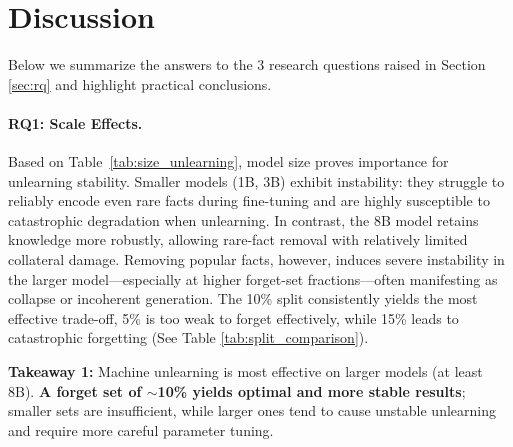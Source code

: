 \section{Discussion}



    

Below we summarize the answers to the 3 research questions raised in Section \ref{sec:rq} and highlight practical conclusions.

\paragraph{RQ1: Scale Effects.}  
Based on Table~\ref{tab:size_unlearning}, model size proves importance for unlearning stability. Smaller models (1B, 3B) exhibit instability: they struggle to reliably encode even rare facts during fine-tuning and are highly susceptible to catastrophic degradation when unlearning. In contrast, the 8B model retains knowledge more robustly, allowing rare-fact removal with relatively limited collateral damage. Removing popular facts, however, induces severe instability in the larger model—especially at higher forget-set fractions—often manifesting as collapse or incoherent generation. The 10\% split consistently yields the most effective trade-off, 5\% is too weak to forget effectively, while 15\% leads to catastrophic forgetting (See Table \ref{tab:split_comparison}).

\begin{tcolorbox}[colback=gray!10, colframe=black!50, 
  boxrule=0.5pt, arc=3pt, left=6pt, right=6pt, top=4pt, bottom=4pt]
\textbf{Takeaway 1:} Machine unlearning is most effective on larger models (at least 8B). \textbf{A forget set of $\sim$10\% yields optimal and more stable results}; smaller sets are insufficient, while larger ones tend to cause unstable unlearning and require more careful parameter tuning.
\end{tcolorbox}

